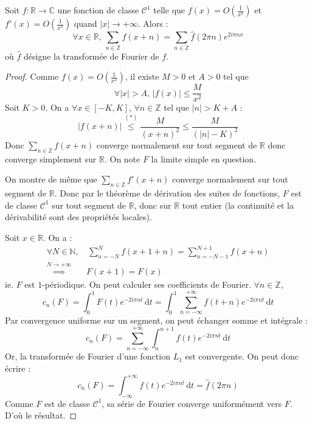 






	\begin{theorem}
		\label{formule-sommatoire-de-poisson-1}
		Soit $f : \mathbb{R} \rightarrow \mathbb{C}$ une fonction de classe $\mathcal{C}^1$ telle que $f(x) = O \left( \frac{1}{x^2} \right)$ et $f'(x) = O \left( \frac{1}{x^2} \right)$ quand $|x| \longrightarrow +\infty$. Alors :
		\[ \forall x \in \mathbb{R}, \, \sum_{n \in \mathbb{Z}} f(x+n) = \sum_{n \in \mathbb{Z}} \widehat{f}(2 \pi n) e^{2 i \pi n x} \]
		où $\widehat{f}$ désigne la transformée de Fourier de $f$.
	\end{theorem}

	\begin{proof}
		Comme $f(x) = O \left( \frac{1}{x^2} \right)$, il existe $M > 0$ et $A > 0$ tel que
		\[ \forall |x| > A, \, |f(x)| \leq \frac{M}{x^2} \tag{$*$} \]
		Soit $K > 0$. On a $\forall x \in [-K, K]$, $\forall n \in \mathbb{Z}$ tel que $|n| > K + A$ :
		\[ |f(x+n)| \overset{(*)}{\leq} \frac{M}{(x+n)^2} \leq \frac{M}{(|n| - K)^2} \]
		Donc $\sum_{n \in \mathbb{Z}} f(x+n)$ converge normalement sur tout segment de $\mathbb{R}$ donc converge simplement sur $\mathbb{R}$. On note $F$ la limite simple en question.

		\medskip
		On montre de même que $\sum_{n \in \mathbb{Z}} f'(x+n)$ converge normalement sur tout segment de $\mathbb{R}$. Donc par le théorème de dérivation des suites de fonctions, $F$ est de classe $\mathcal{C}^1$ sur tout segment de $\mathbb{R}$, donc sur $\mathbb{R}$ tout entier (la continuité et la dérivabilité sont des propriétés locales).

		\medskip
		Soit $x \in \mathbb{R}$. On a :
		\begin{align*}
			\forall N \in \mathbb{N}, &\, \sum_{n=-N}^N f(x+1+n) = \sum_{n=-N-1}^{N+1} f(x+n) \\
			\overset{N \longrightarrow +\infty}{\implies} & F(x+1) = F(x)
		\end{align*}
		ie. $F$ est $1$-périodique. On peut calculer ses coefficients de Fourier. $\forall n \in \mathbb{Z}$,
		\[ c_n(F) = \int_0^1 F(t) e^{-2i\pi n t} \, \mathrm{d}t = \int_0^1 \sum_{n=-\infty}^{+\infty} f(t+n) e^{-2i\pi n t} \, \mathrm{d}t \]
		Par convergence uniforme sur un segment, on peut échanger somme et intégrale :
		\[ c_n(F) = \sum_{n=-\infty}^{+\infty} \int_n^{n+1} f(t) e^{-2i\pi n t} \, \mathrm{d}t \]
		Or, la transformée de Fourier d'une fonction $L_1$ est convergente. On peut donc écrire :
		\[ c_n(F) = \int_{-\infty}^{+\infty} f(t) e^{-2i\pi n t} \, \mathrm{d}t = \widehat{f}(2\pi n) \]
		Comme $F$ est de classe $\mathcal{C}^1$, sa série de Fourier converge uniformément vers $F$. D'où le résultat.
	\end{proof}

